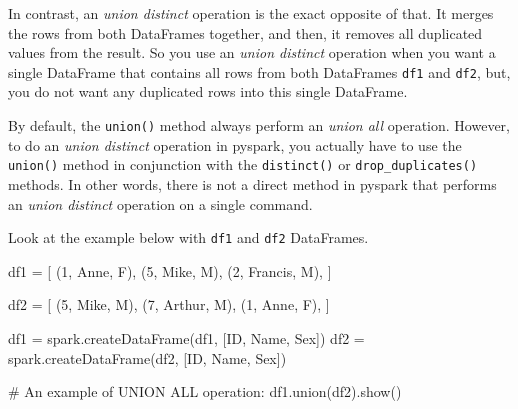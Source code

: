 \documentclass[
  11pt,
  letterpaper,
  DIV=11,
  numbers=noendperiod]{scrreprt}
\newenvironment{Shaded}{\begin{snugshade}}{\end{snugshade}}
\newcommand{\CommentTok}[1]{\textcolor[rgb]{0.37,0.37,0.37}{#1}}
\newcommand{\DecValTok}[1]{\textcolor[rgb]{0.68,0.00,0.00}{#1}}
\newcommand{\NormalTok}[1]{\textcolor[rgb]{0.00,0.23,0.31}{#1}}
\newcommand{\OperatorTok}[1]{\textcolor[rgb]{0.37,0.37,0.37}{#1}}
\newcommand{\StringTok}[1]{\textcolor[rgb]{0.13,0.47,0.30}{#1}}
\begin{document}
In contrast, an \emph{union distinct} operation is the exact opposite of
that. It merges the rows from both DataFrames together, and then, it
removes all duplicated values from the result. So you use an \emph{union
distinct} operation when you want a single DataFrame that contains all
rows from both DataFrames \texttt{df1} and \texttt{df2}, but, you do not
want any duplicated rows into this single DataFrame.

By default, the \texttt{union()} method always perform an \emph{union
all} operation. However, to do an \emph{union distinct} operation in
pyspark, you actually have to use the \texttt{union()} method in
conjunction with the \texttt{distinct()} or \texttt{drop\_duplicates()}
methods. In other words, there is not a direct method in pyspark that
performs an \emph{union distinct} operation on a single command.

Look at the example below with \texttt{df1} and \texttt{df2} DataFrames.

\begin{Shaded}
\begin{Highlighting}[]
\NormalTok{df1 }\OperatorTok{=}\NormalTok{ [}
\NormalTok{    (}\DecValTok{1}\NormalTok{, }\StringTok{\textquotesingle{}Anne\textquotesingle{}}\NormalTok{, }\StringTok{\textquotesingle{}F\textquotesingle{}}\NormalTok{),}
\NormalTok{    (}\DecValTok{5}\NormalTok{, }\StringTok{\textquotesingle{}Mike\textquotesingle{}}\NormalTok{, }\StringTok{\textquotesingle{}M\textquotesingle{}}\NormalTok{),}
\NormalTok{    (}\DecValTok{2}\NormalTok{, }\StringTok{\textquotesingle{}Francis\textquotesingle{}}\NormalTok{, }\StringTok{\textquotesingle{}M\textquotesingle{}}\NormalTok{),}
\NormalTok{]}

\NormalTok{df2 }\OperatorTok{=}\NormalTok{ [}
\NormalTok{    (}\DecValTok{5}\NormalTok{, }\StringTok{\textquotesingle{}Mike\textquotesingle{}}\NormalTok{, }\StringTok{\textquotesingle{}M\textquotesingle{}}\NormalTok{),}
\NormalTok{    (}\DecValTok{7}\NormalTok{, }\StringTok{\textquotesingle{}Arthur\textquotesingle{}}\NormalTok{, }\StringTok{\textquotesingle{}M\textquotesingle{}}\NormalTok{),}
\NormalTok{    (}\DecValTok{1}\NormalTok{, }\StringTok{\textquotesingle{}Anne\textquotesingle{}}\NormalTok{, }\StringTok{\textquotesingle{}F\textquotesingle{}}\NormalTok{),}
\NormalTok{]}

\NormalTok{df1 }\OperatorTok{=}\NormalTok{ spark.createDataFrame(df1, [}\StringTok{\textquotesingle{}ID\textquotesingle{}}\NormalTok{, }\StringTok{\textquotesingle{}Name\textquotesingle{}}\NormalTok{, }\StringTok{\textquotesingle{}Sex\textquotesingle{}}\NormalTok{])}
\NormalTok{df2 }\OperatorTok{=}\NormalTok{ spark.createDataFrame(df2, [}\StringTok{\textquotesingle{}ID\textquotesingle{}}\NormalTok{, }\StringTok{\textquotesingle{}Name\textquotesingle{}}\NormalTok{, }\StringTok{\textquotesingle{}Sex\textquotesingle{}}\NormalTok{])}

\CommentTok{\# An example of UNION ALL operation:}
\NormalTok{df1.union(df2).show()}
\end{Highlighting}
\end{Shaded}
\end{document}
